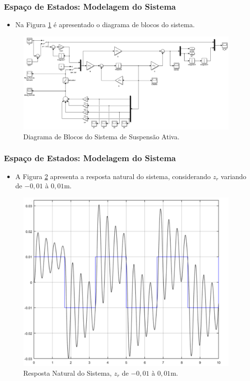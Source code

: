 \documentclass{beamer}
\begin{document}
\begin{frame}
\frametitle{Espaço de Estados: Modelagem do Sistema}
\begin{itemize}
\item Na Figura \ref{modeloSimulink2} é apresentado o diagrama de blocos do sistema.
\end{itemize}
\begin{figure}[H]
	\centering
\includegraphics[width=\columnwidth]{./imagens/modeloSimulink_malha_fechada.pdf}
    \renewcommand{\figurename}{Fig. 4}
    \caption{Diagrama de Blocos do Sistema de Suspensão Ativa.}
	\label{modeloSimulink2}
\end{figure}
\end{frame}

\begin{frame}
\frametitle{Espaço de Estados: Modelagem do Sistema}
\begin{itemize}
\item A Figura \ref{malhaabertaEE} apresenta a resposta natural do sistema, considerando $z_r$ variando de $-0,01$ à $0,01$m.
\end{itemize}
\begin{figure}[H]
	\centering
\includegraphics[width=.55\columnwidth]{./imagens/resposta_natural_sistema.pdf}
	\renewcommand{\figurename}{Fig. 5}
    \caption{Resposta Natural do Sistema, $z_r$ de $-0,01$ à $0,01$m.}
	\label{malhaabertaEE}
\end{figure}
\end{frame}
\end{document}

